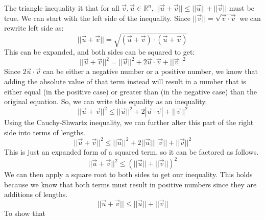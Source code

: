 \documentclass{article}
\begin{document}
The triangle inequality it that for all $\vec{v},\vec{u} \in \mathbb{R}^{n}$, $||\vec{u}+\vec{v}|| \leq ||\vec{u}|| + ||\vec{v}||$ must be true. We can start with the left side of the inequality. Since $||\vec{v}|| = \sqrt{\vec{v}\cdot\vec{v}}$ we can rewrite left side as:
\[||\vec{u} + \vec{v}|| = \sqrt{(\vec{u}+\vec{v})\cdot(\vec{u}+\vec{v})}\]
This can be expanded, and both sides can be squared to get:
\[||\vec{u} + \vec{v}||^{2} = ||\vec{u}||^{2} + 2\vec{u}\cdot\vec{v}+||\vec{v}||^{2}\]
Since $2\vec{u}\cdot\vec{v}$ can be either a negative number or a positive number, we know that adding the absolute value of that term instead will result in a number that is either equal (in the positive case) or greater than (in the negative case) than the original equation. So, we can write this equality as an inequality.
\[||\vec{u} + \vec{v}||^{2} \leq ||\vec{u}||^{2} + 2|\vec{u}\cdot\vec{v}|+||\vec{v}||^{2}\]
Using the Cauchy-Shwartz inequality, we can further alter this part of the right side into terms of lengths.
\[||\vec{u} + \vec{v}||^{2} \leq ||\vec{u}||^{2} + 2||\vec{u}||||\vec{v}||+||\vec{v}||^{2}\]
This is just an expanded form of a squared term, so it can be factored as follows.
\[||\vec{u} + \vec{v}||^{2} \leq (||\vec{u}||+||\vec{v}||)^{2} \]
We can then apply a square root to both sides to get our inequality. This holds because we know that both terms must result in positive numbers since they are additions of lengths.
\[||\vec{u} + \vec{v}|| \leq ||\vec{u}||+||\vec{v}|| \]
To show that
\end{document}
